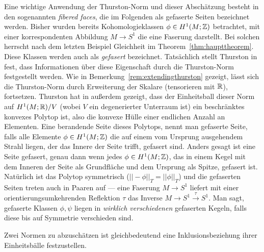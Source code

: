     \begin{bsp}
    \label{ex:fiberedfaces}
        Eine wichtige Anwendung der Thurston-Norm und dieser Abschätzung besteht in den sogenannten \textit{fibered faces}, die im Folgenden als gefaserte Seiten bezeichnet werden. Bisher wurden bereits Kohomologieklassen $\phi \in H^1(M;\mathbb{Z})$ betrachtet, mit einer korrespondenten Abbildung $M \to S^1$ die eine Faserung darstellt. Bei solchen herrscht nach dem letzten Beispiel Gleichheit im Theorem~\ref{thm:haupttheorem}. Diese Klassen werden auch als \textit{gefasert} bezeichnet. Tatsächlich stellt Thurston in \cite{Thurston.1986} fest, dass Informationen über diese Eigenschaft durch die Thurston-Norm festgestellt werden. Wie in Bemerkung~\ref{rem:extendingthurston} gezeigt, lässt sich die Thurston-Norm durch Erweiterung der Skalare (tensorieren mit $\mathbb{R}$), fortsetzen. Thurston hat in \cite{Thurston.1986} außerdem gezeigt, dass der Einheitsball dieser Norm auf $H^1(M;\mathbb{R})/V$ (wobei $V$ ein degenerierter Unterraum ist) ein beschränktes konvexes Polytop ist, also die konvexe Hülle einer endlichen Anzahl an Elementen. Eine berandende Seite dieses Polytops, nennt man gefaserte Seite, falls alle Elemente $\phi \in H^1(M;\mathbb{Z})$ die auf einem vom Ursprung ausgehendem Strahl liegen, der das Innere der Seite trifft, gefasert sind. Anders gesagt ist eine Seite gefasert, genau dann wenn jedes $\phi \in H^1(M;\mathbb{Z})$, das in einem Kegel mit dem Inneren der Seite als Grundfläche und dem Ursprung als Spitze, gefasert ist. Natürlich ist das Polytop symmetrisch ($||-\phi||_T=||\phi||_T$) und die gefaserten Seiten treten auch in Paaren auf --- eine Faserung $M \to S^1$ liefert mit einer orientierungsumkehrenden Reflektion $\tau$ das Inverse $M \to S^1 \stackrel \tau \to S^1$. Man sagt, gefaserte Klassen $\phi,\psi$ liegen in \textit{wirklich verschiedenen} gefaserten Kegeln, falls diese bis auf Symmetrie verschieden sind. 
    \end{bsp}

    \begin{bem}
        Zwei Normen zu abzuschätzen ist gleichbedeutend eine Inklusionsbeziehung ihrer Einheitsbälle festzustellen.
    \end{bem}

